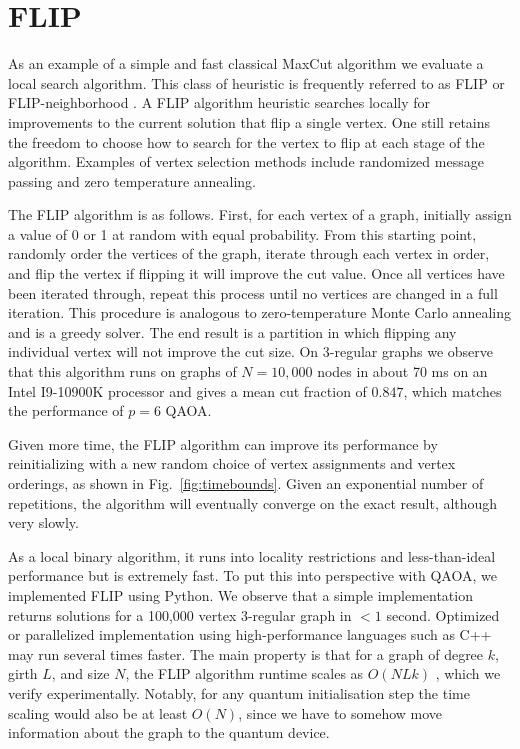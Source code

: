 \documentclass[prb,reprint,nofootinbib,longbibliography,superscriptaddress]{revtex4-1}
\begin{document}
\section{FLIP}
\label{sec:flip}


As an example of a simple and fast classical MaxCut algorithm we evaluate a local search algorithm.
This class of heuristic is frequently referred to as FLIP \cite{favorablelandscapes} or FLIP-neighborhood \cite{elsaesser2011settling}.
A FLIP algorithm heuristic searches locally for improvements to the current solution that flip a single vertex. One still retains  the freedom to choose how to search for the vertex to flip at each stage of the algorithm. Examples of vertex selection methods include randomized message passing \cite{alaoui2021local} and zero temperature annealing.

The FLIP algorithm is as follows. First, for each vertex of a graph,  initially assign a value of 0 or 1 at random with equal probability. From this starting point, randomly order the vertices of the graph,  iterate through each vertex in order, and flip the vertex if flipping it will improve the cut value. Once all vertices have been iterated through, repeat this process until no vertices are changed in a full iteration. This procedure is analogous to  zero-temperature Monte Carlo annealing and is a greedy solver. The end result is a partition in which flipping any individual vertex will not improve the cut size. On 3-regular graphs we observe that this algorithm runs on graphs of $N=10,000$ nodes in about 70 ms on an Intel I9-10900K processor and gives a mean cut fraction of $0.847$,
which matches the performance of $p=6$ QAOA.

Given more time, the FLIP algorithm can improve its performance by reinitializing with a new random choice of vertex assignments and vertex orderings, as shown in Fig.~\ref{fig:timebounds}. Given an exponential number of repetitions, the algorithm will eventually converge on the exact result, although very slowly.


As a local binary algorithm, it runs into locality restrictions \cite{barak2021classical} and less-than-ideal performance but is extremely fast.
To put this into perspective with QAOA, we implemented FLIP using Python. We observe that a simple implementation returns solutions for a 100,000 vertex 3-regular graph in $<1$ second.
Optimized or parallelized implementation using high-performance languages such as C++ may run several times faster.
The main property is that for a graph of degree $k$, girth $L$, and size $N$, the FLIP algorithm runtime scales as $O(NLk)$ \cite{alaoui2021local},
which we verify experimentally. Notably, for any quantum initialisation step the time scaling would also be at least $O(N)$, since we have to somehow move information about the graph to the quantum device.
\end{document}
